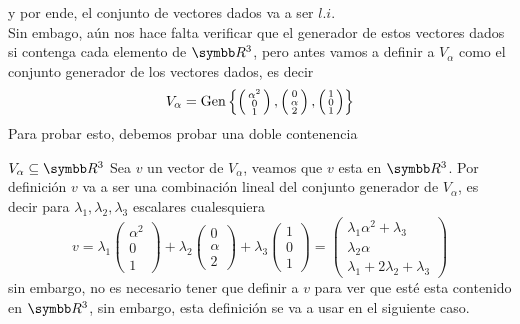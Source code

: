     y por ende, el conjunto de vectores dados va a ser \(l.i\).
    \\
    Sin embago, aún nos hace falta verificar que el generador de estos vectores dados si contenga cada elemento de \(\realR^3\), 
    pero antes vamos a definir a \(V_\alpha\) como el conjunto generador de los vectores dados, es decir
    \[
        V_\alpha = 
            \text{Gen} \left\{ 
                \left(\begin{smallmatrix}\alpha^2 \\ 0 \\ 1\end{smallmatrix}\right),
                \left(\begin{smallmatrix}0 \\ \alpha \\ 2 \end{smallmatrix}\right),
                \left(\begin{smallmatrix}1 \\ 0 \\ 1\end{smallmatrix}\right)
             \right\}
    \]
    Para probar esto, debemos probar una doble contenencia
    \ResetCases{}
    \begin{mathcase}{{\(V_\alpha \subseteq \realR^3\)}}
        Sea \(v\) un vector de \(V_\alpha\), veamos que \(v\) esta en \(\realR^3\).
        Por definición \(v\) va a ser una combinación lineal del conjunto generador de \(V_\alpha\), es decir 
        para \(\lambda_1, \lambda_2, \lambda_3\) escalares cualesquiera
        \[
            v = 
            \lambda_1
            \begin{pmatrix}
                \alpha^2 \\ 0 \\ 1
            \end{pmatrix}
            +
            \lambda_2
            \begin{pmatrix}
                0 \\ \alpha \\ 2
            \end{pmatrix}
            +
            \lambda_3
            \begin{pmatrix}
                1 \\ 0 \\ 1
            \end{pmatrix}
            =
            \begin{pmatrix}
                \lambda_1\alpha^2 + \lambda_3 \\
                \lambda_2\alpha \\
                \lambda_1 + 2\lambda_2 + \lambda_3
            \end{pmatrix}
        \]
        sin embargo, no es necesario tener que definir a \(v\) para ver que esté esta contenido en \(\realR^3\), sin embargo, esta 
        definición se va a usar en el siguiente caso.
    \end{mathcase}
